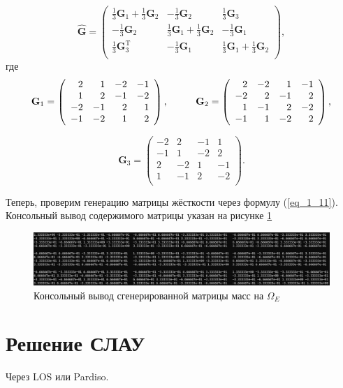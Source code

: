 \begin{equation*}
	\hat{\textbf{G}} = \left(
	\begin{array}{ccc}
		\frac{1}{3}\textbf{G}_1 + \frac{1}{3}\textbf{G}_2 & -\frac{1}{3}\textbf{G}_2 & \frac{1}{3}\textbf{G}_3 \\
		-\frac{1}{3}\textbf{G}_2 & \frac{1}{3}\textbf{G}_1 + \frac{1}{3}\textbf{G}_2 & -\frac{1}{3}\textbf{G}_1 \\
		\frac{1}{3}\textbf{G}^\text{T}_3 & -\frac{1}{3}\textbf{G}_1 & \frac{1}{3}\textbf{G}_1 + \frac{1}{3}\textbf{G}_2 \\
	\end{array}
	\right),
\end{equation*}
где
\begin{equation*}
	\textbf{G}_1 = \left(
	\begin{array}{rrrr}
		2 & 1 & -2 & -1 \\
		1 & 2 & -1 & -2 \\
		-2 & -1 & 2 & 1 \\
		-1 & -2 & 1 & 2 \\
	\end{array}
	\right),
	\hspace{10mm}
	\textbf{G}_2 = \left(
	\begin{array}{rrrr}
		2 & -2 & 1 & -1 \\
		-2 & 2 & -1 & 2 \\
		1 & -1 & 2 & -2 \\
		-1 & 1 & -2 & 2 \\
	\end{array}
	\right),
\end{equation*}

\begin{equation*}
	\textbf{G}_3 = \left(
	\begin{array}{rrrr}
		-2 & 2 & -1 & 1 \\
		-1 & 1 & -2 & 2 \\
		2 & -2 & 1 & -1 \\
		1 & -1 & 2 & -2 \\
	\end{array}
	\right).
\end{equation*}

Теперь, проверим генерацию матрицы жёсткости через формулу (\ref{eq_1_11}). Консольный вывод содержимого матрицы указан на рисунке \ref{fig:GeneratedMatrixStiffness}

\begin{figure}
	\centering
	\vspace*{0.7cm}
	\includegraphics[width=1.0\linewidth]{images/G.png}
	\caption{Консольный вывод сгенерированной матрицы масс на $\Omega_E$}
	\label{fig:GeneratedMatrixStiffness}
\end{figure}

\section{Решение СЛАУ}

Через LOS или Pardiso.






